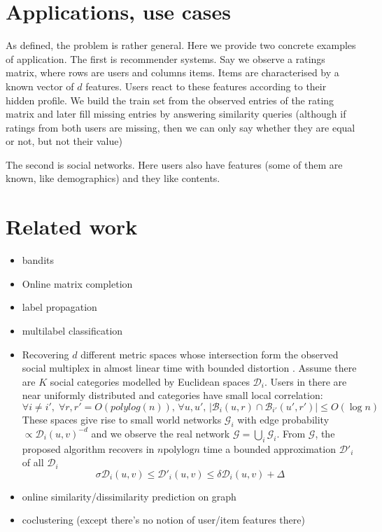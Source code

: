 \section{Applications, use cases}

As defined, the problem is rather general. Here we provide two concrete
examples of application. The first is recommender systems. Say we observe a
ratings matrix, where rows are users and columns items. Items are characterised
by a known vector of $d$ features. Users react to these features according to
their hidden profile. We build the train set from the observed entries of the
rating matrix and later fill missing entries by answering similarity queries
(although if ratings from both users are missing, then we can only say whether
they are equal or not, but not their value)

The second is social networks. Here users also have features (some of them are
known, like demographics) and they like contents. 

\section{Related work}

\begin{itemize}
	\item bandits \autocites{ClusterBandit14}{Li2015}
	\item Online matrix completion \autocite{OnlineMatrix15}
	\item label propagation \autocite{LabelPropa03}
	\item multilabel classification \autocite{Madjarov2012}
	\item Recovering $d$ different metric spaces whose intersection form the
		observed social multiplex in almost linear time with bounded distortion
		\autocite{Abraham2012a}. Assume there are $K$ social categories
		modelled by Euclidean spaces $\mathcal{D}_i$. Users in there are near
		uniformly distributed and categories have small local correlation: \[
			\forall i\neq i', \; \forall r, r' = O(polylog(n)),\, \forall u,
			u',\, |\mathcal{B}_i(u, r) \cap \mathcal{B}_{i'}(u', r')| \leq O(\log n) \]
		These spaces give rise to small world networks $\mathcal{G}_i$ with
		edge probability $\propto \mathcal{D}_i(u, v)^{-d}$ and we observe the
		real network $\mathcal{G} =\bigcup_i \mathcal{G}_i$. From
		$\mathcal{G}$, the proposed algorithm recovers in $n \mathrm{polylog} n$ time
		a bounded approximation $\mathcal{D}'_i$ of all $\mathcal{D}_i$ \[
			\sigma \mathcal{D}_i(u, v) \leq \mathcal{D}'_i(u, v) \leq \delta
			\mathcal{D}_i(u, v) + \Delta \]
	\item online similarity/dissimilarity prediction on graph \autocite{Gentile2013}
	\item coclustering \autocite{Dhillon2001} (except there's no notion of
		user/item features there)
\end{itemize}

